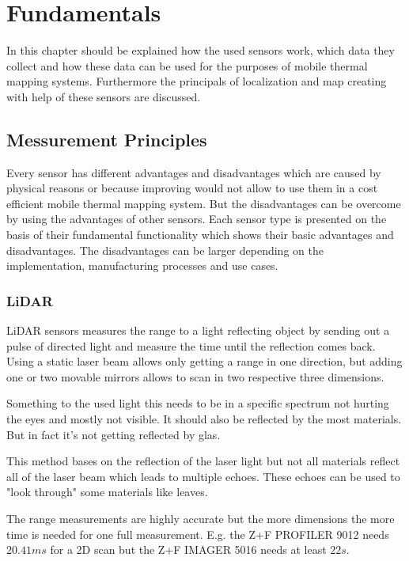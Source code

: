 \chapter{Fundamentals}\label{ch:fundamentals}
In this chapter should be explained how the used sensors work, which data they collect and how these data can be used for the purposes of mobile thermal mapping systems.
Furthermore the principals of localization and map creating with help of these sensors are discussed.

\section{Messurement Principles}\label{sec:messurementPrinciples}
Every sensor has different advantages and disadvantages which are caused by physical reasons or because improving would not allow to use them in a cost efficient mobile thermal mapping system.
But the disadvantages can be overcome by using the advantages of other sensors.
Each sensor type is presented on the basis of their fundamental functionality which shows their basic advantages and disadvantages.
The disadvantages can be larger depending on the implementation, manufacturing processes and use cases.

\subsection{LiDAR}\label{ssec:lidar}

\ac{LiDAR} sensors measures the range to a light reflecting object by sending out a pulse of directed light and measure the time until the reflection comes back.
Using a static laser beam allows only getting a range in one direction, but adding one or two movable mirrors allows to scan in two respective three dimensions. 

Something to the used light this needs to be in a specific spectrum not hurting the eyes and mostly not visible.
It should also be reflected by the most materials.
But in fact it's not getting reflected by glas.


This method bases on the reflection of the laser light but not all materials reflect all of the laser beam which leads to multiple echoes.
These echoes can be used to "look through" some materials like leaves. 

The range measurements are highly accurate but the more dimensions the more time is needed for one full measurement.
E.g. the Z+F PROFILER\circledR{} 9012 needs $20.41\si{ms}$ for a 2D scan but the Z+F IMAGER\circledR{} 5016 needs at least $22\si{s}$.

